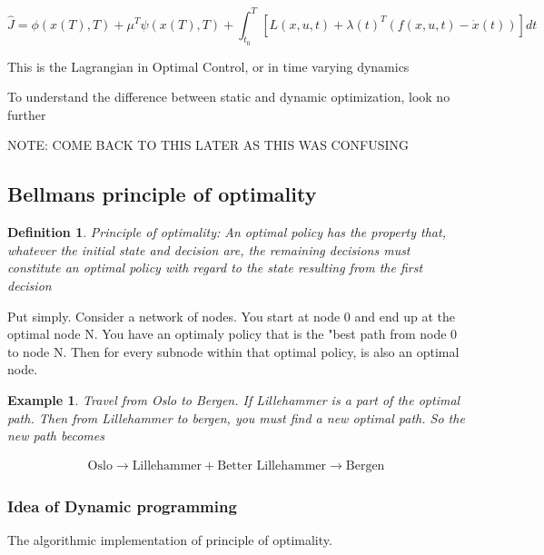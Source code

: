 \documentclass[11pt, a4paper]{article} %
\newtheorem{definition}[theorem]{Definition}
\newtheorem{example}[theorem]{Example}
\begin{document}
\[
    \hat{J} = \phi(x(T), T) + \mu^T \psi(x(T), T) + \int_{t_0}^{T} \left[ L(x, u, t) + \lambda(t)^T \left( f(x, u, t) - \dot{x}(t) \right)   \right] dt
\]

This is the Lagrangian in Optimal Control, or in time varying dynamics


To understand the difference between static and dynamic optimization, look no further





NOTE:  COME BACK TO THIS LATER AS THIS WAS CONFUSING





\subsection{Bellmans principle of optimality}

\begin{definition}
    Principle of optimality: An optimal policy has the property that, whatever the initial state and decision are, the remaining decisions must constitute an optimal policy with regard to the state resulting from the first decision
\end{definition}

Put simply. Consider a network of nodes. You start at node 0 and end up at the optimal node N. You have an optimaly policy that is the "best path from node 0 to node N. Then for every subnode within that optimal policy, is also an optimal node. 

\begin{example}
    Travel from Oslo to Bergen. If Lillehammer is a part of the optimal path. Then from Lillehammer to bergen, you must find a new optimal path. So the new path becomes 

    \begin{align*}
        \text{Oslo} \rightarrow \text{Lillehammer} + \text{Better Lillehammer} \rightarrow \text{Bergen} 
    \end{align*}
    
\end{example}


\subsubsection{Idea of Dynamic programming}

The algorithmic implementation of principle of optimality.
\end{document}
